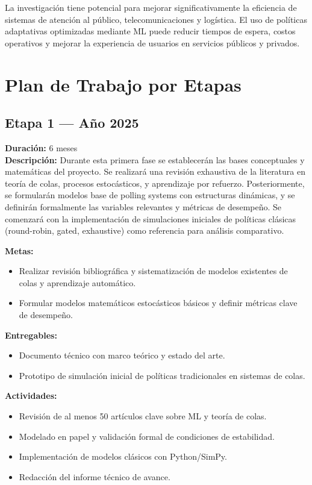 \documentclass[12pt]{article}
\begin{document}
La investigación tiene potencial para mejorar significativamente la eficiencia de sistemas de atención al público, telecomunicaciones y logística. El uso de políticas adaptativas optimizadas mediante ML puede reducir tiempos de espera, costos operativos y mejorar la experiencia de usuarios en servicios públicos y privados.

\section{Plan de Trabajo por Etapas}

\subsection*{Etapa 1 — Año 2025}
\textbf{Duración:} 6 meses\\
\textbf{Descripción:} Durante esta primera fase se establecerán las bases conceptuales y matemáticas del proyecto. Se realizará una revisión exhaustiva de la literatura en teoría de colas, procesos estocásticos, y aprendizaje por refuerzo. Posteriormente, se formularán modelos base de polling systems con estructuras dinámicas, y se definirán formalmente las variables relevantes y métricas de desempeño. Se comenzará con la implementación de simulaciones iniciales de políticas clásicas (round-robin, gated, exhaustive) como referencia para análisis comparativo.

\textbf{Metas:}
\begin{itemize}
  \item Realizar revisión bibliográfica y sistematización de modelos existentes de colas y aprendizaje automático.
  \item Formular modelos matemáticos estocásticos básicos y definir métricas clave de desempeño.
\end{itemize}

\textbf{Entregables:}
\begin{itemize}
  \item Documento técnico con marco teórico y estado del arte.
  \item Prototipo de simulación inicial de políticas tradicionales en sistemas de colas.
\end{itemize}

\textbf{Actividades:}
\begin{itemize}
  \item Revisión de al menos 50 artículos clave sobre ML y teoría de colas.
  \item Modelado en papel y validación formal de condiciones de estabilidad.
  \item Implementación de modelos clásicos con Python/SimPy.
  \item Redacción del informe técnico de avance.
\end{itemize}
\end{document}
